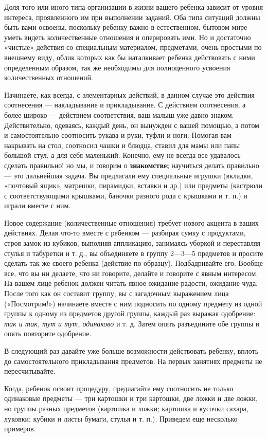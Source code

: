 \documentclass[a5paper]{book}
\renewcommand{\emph}[1]{\textit{#1}}
\begin{document}
Доля того или иного типа организации в жизни вашего ребенка зависит от
уровня интереса, проявленного им при выполнении заданий. Оба типа
ситуаций должны быть вами освоены, поскольку ребенку важно в
естественном, бытовом мире уметь видеть количественные отношения и
оперировать ими. Но и достаточно «чистые» действия со специальным
материалом, предметами, очень простыми по внешнему виду, облик которых
как бы наталкивает ребенка действовать с ними определенным образом, так
же необходимы для полноценного усвоения количественных отношений.

Начинаете, как всегда, с элементарных действий, в данном случае это
действия соотнесения --- накладывание и прикладывание. С действием
соотнесения, а более широко --- действием соответствия, ваш малыш уже
давно знаком. Действительно, одеваясь, каждый день, он вынужден с вашей
помощью, а потом и самостоятельно соотносить рукава и руки, туфли и
ноги. Помогая вам накрывать на стол, соотносил чашки и блюдца, ставил
для мамы или папы большой стул, а для себя маленький. Конечно, ему не
всегда все удавалось сделать правильно! но мы, и говорим о
\textbf{знакомстве;} научиться делать правильно --- это дальнейшая
задача. Вы предлагали ему специальные игрушки (вкладки, «почтовый ящик»,
матрешки, пирамидки, вставки и др.) или предметы (кастрюли с
соответствующими крышками, баночки разного рода с крышками и т. п.) и
играли вместе с ним.

Новое содержание (количественные отношения) требует нового акцента в
ваших действиях. Делая что-то вместе с ребенком --- разбирая сумку с
продуктами, строя замок из кубиков, выполняя аппликацию, занимаясь
уборкой и переставляя стулья и табуретки и т. д., вы объединяете в
группу 2---3---5 предметов и просите сделать так же своего ребенка
(действие по образцу). Подбадривайте его. Вообще все, что вы ни делаете,
что ни говорите, делайте и говорите с явным интересом. На вашем лице
ребенок должен читать явное ожидание радости, ожидание чуда. После того
как он составит группу, вы с загадочным выражением лица («Посмотрим!»)
начинаете вместе с ним подносить по одному предмету из одной группы к
одному из предметов другой группы, каждый раз выражая одобрение:
\emph{так и так, тут и тут, одинаково} и т. д. Затем опять разъедините
обе группы и опять повторите одобрение.

В следующий раз давайте уже больше возможности действовать ребенку,
вплоть до самостоятельного прикладывания предметов. На первых занятиях
предметы не пересчитывайте.

Когда, ребенок освоит процедуру, предлагайте ему соотносить не только
одинаковые предметы --- три картошки и три картошки, две ложки и две
ложки, но группы разных предметов (картошка и ложки; картошка и кусочки
сахара, луковки; кубики и листы бумаги, стулья и т. п.). Приведем еще
несколько примеров.
\end{document}

